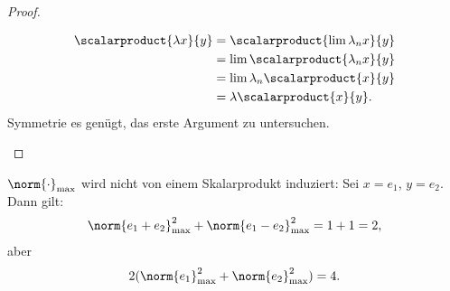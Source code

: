 \begin{proof}
\begin{proofdescription}
\begin{subproof}
\begin{proofdescription}
\begin{itemize}
\begin{enumerate}[label=\rechtsklammer{\arabic*}]
\begin{align*}
                            \scalarproduct{\lambda x}{y}\begin{aligned}[t]
                                &=\scalarproduct{\lim \lambda_n x}{y}\\
                                &=\lim \scalarproduct{\lambda_n x}{y}\\
                                &=\lim \lambda_n \scalarproduct{x}{y}\\
                                &=\lambda\scalarproduct{x}{y}.
                            \end{aligned}
                        \end{align*}
                        Symmetrie \timplies es genügt, das erste Argument zu untersuchen.
                    \end{enumerate}
                \end{itemize} 
            \end{proofdescription}
        \end{subproof}
    \end{proofdescription}
\end{proof}
\begin{beispiel*}
    \( \norm{\cdot}_{\text{max}} \) wird nicht von einem Skalarprodukt induziert: Sei \( x=e_1\), \( y=e_2 \). Dann gilt:
    \begin{align*}
        \norm{e_1+e_2}^2_{\text{max}}+\norm{e_1-e_2}^2_{\text{max}}=1+1=2,
    \end{align*}
    aber
    \begin{align*}
        2(\norm{e_1}^2_{\text{max}}+\norm{e_2}^2_{\text{max}})=4.
    \end{align*}
\end{beispiel*}
